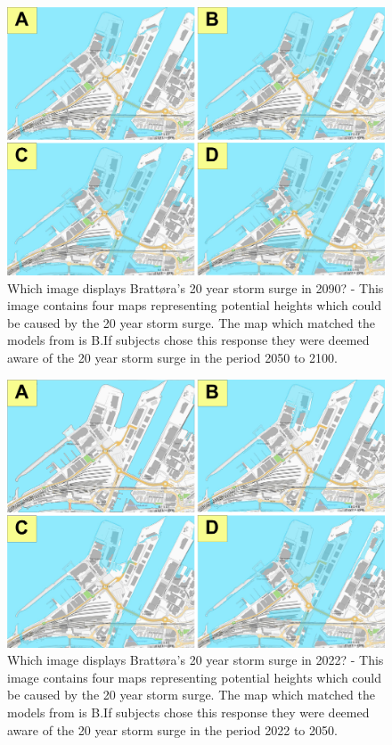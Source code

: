 \begin{figure}[H]
    \centering
    \includegraphics[width=16cm]{fig/brattora question on 2090 20 yr storm surge quadrant.png} 
    \caption{Which image displays Brattøra's 20 year storm surge in 2090? - This image contains four maps representing potential heights which could be caused by the 20 year storm surge. The map which matched the models from \cite{kartverket_se_2021} is B.If subjects chose this response they were deemed aware of the 20 year storm surge in the period 2050 to 2100. }
    \label{fig:brattora_2090_stormsurge}
\end{figure}

\begin{figure}[H]
    \centering
    \includegraphics[width=16cm]{fig/brattora question on 2022 20 yr storm surge quadrant.png}
    \caption{Which image displays Brattøra's 20 year storm surge in 2022? - This image contains four maps representing potential heights which could be caused by the 20 year storm surge. The map which matched the models from \cite{kartverket_se_2021} is B.If subjects chose this response they were deemed aware of the 20 year storm surge in the period 2022 to 2050.}
    \label{fig:brattora_2022_stormsurge}
\end{figure}

